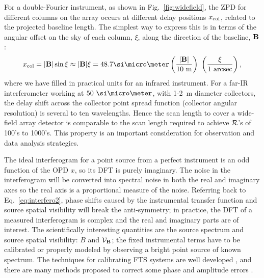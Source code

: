 For a double-Fourier instrument, as shown in Fig.~\ref{fig:widefield}, the ZPD for different columns on the array occurs at different delay positions $x_{\textrm{col}}$, related to
the projected baseline length. The simplest way to express this is in terms of the angular offset on the sky of each column, $\xi$, along the
direction of the baseline, $\mathbf{B}$:
\begin{equation}
x_{\col} = | \baseline | \sin\xi \approx | \baseline | \xi = 48.7 \um \left({| \baseline | \over 10~\textrm{m}}\right) \ \left( {\xi \over 1~\textrm{arcsec}}\right) ,
\label{eq:delay}
\end{equation}
where we have filled in
practical units for an infrared instrument. For a far-IR interferometer working at $50~\um$, with
1-2~m diameter collectors, the delay shift across the collector point spread function (collector angular resolution) is several to ten wavelengths.
Hence the scan length to cover a wide-field array detector is comparable to the scan length required to achieve
$\mathcal{R}$'s of 100's to 1000's. This property is an important consideration for observation and data analysis strategies.

The ideal interferogram for a point source from a perfect instrument is an odd function of the OPD $x$, so its DFT is purely imaginary. The noise in the interferogram will be converted into spectral noise in both the real and imaginary axes so the real axis is a proportional measure of the noise. 
Referring back to Eq.~\ref{eq:interfero2}, phase shifts caused by the instrumental transfer function and source spatial visibility will
break the anti-symmetry; in practice, the DFT of a measured interferogram is complex and the real and imaginary parts are of interest.
The scientifically interesting quantities are the source spectrum and source spatial visibility: $B$ and $\mathcal{V}_{\mathbf{B}}$; the fixed
instrumental terms have to be calibrated or properly modeled
by observing a bright point source of known spectrum. The techniques for calibrating FTS systems are well developed
\citep[e.g.][]{Davis:2001tr}, and there are many methods proposed to correct some phase and amplitude errors \citep[e.g.][]{Forman:1966wx, Sromovsky:2003in}. 


